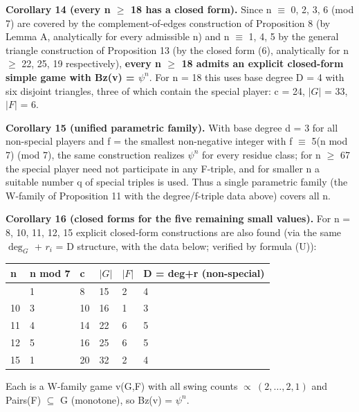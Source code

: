 \documentclass[
]{article}
\newcounter{none} %
\begin{document}
\textbf{Corollary 14 (every n \(\ge\) 18 has a closed form).} Since n
\(\equiv\) 0, 2, 3, 6 (mod 7) are covered by the complement-of-edges
construction of Proposition 8 (by Lemma A, analytically for every
admissible n) and n \(\equiv\) 1, 4, 5 by the general triangle
construction of Proposition 13 (by the closed form (6), analytically for
n \(\ge\) 22, 25, 19 respectively), \textbf{every n \(\ge\) 18 admits an
explicit closed-form simple game with Bz(v) = \(\psi^n\)}. For n = 18
this uses base degree D = 4 with six disjoint triangles, three of which
contain the special player: c = 24, \(\vert G\vert\) = 33,
\(\vert F\vert\) = 6.

\textbf{Corollary 15 (unified parametric family).} With base degree d =
3 for all non-special players and f = the smallest non-negative integer
with f \(\equiv\) 5(n mod 7) (mod 7), the same construction realizes
\(\psi^n\) for every residue class; for n \(\ge\) 67 the special player
need not participate in any F-triple, and for smaller n a suitable
number q of special triples is used. Thus a single parametric family
(the W-family of Proposition 11 with the degree/f-triple data above)
covers all n.

\textbf{Corollary 16 (closed forms for the five remaining small
values).} For n = 8, 10, 11, 12, 15 explicit closed-form constructions
are also found (via the same \(\deg_G\) + \(r_i\) = D structure, with
the data below; verified by formula (U)):

{\def\LTcaptype{none} %
\begin{longtable}[]{@{}llllll@{}}
\toprule\noalign{}
n & n mod 7 & c & \(\vert G\vert\) & \(\vert F\vert\) & D = deg+r
(non-special) \\
\midrule\noalign{}
\endhead
\bottomrule\noalign{}
\endlastfoot
8 & 1 & 8 & 15 & 2 & 4 \\
10 & 3 & 10 & 16 & 1 & 3 \\
11 & 4 & 14 & 22 & 6 & 5 \\
12 & 5 & 16 & 25 & 6 & 5 \\
15 & 1 & 20 & 32 & 2 & 4 \\
\end{longtable}
}

Each is a W-family game v(G,F) with all swing counts
\(\propto\ (2,\dots,2,1)\) and Pairs(F) \(\subseteq\) G (monotone), so
Bz(v) = \(\psi^n.\)
\end{document}
